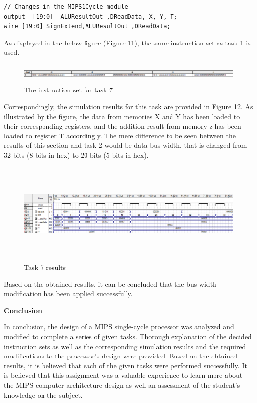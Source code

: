 \documentclass[12pt,a4paper]{article}
\begin{document}
	\begin{lstlisting}[style={verilog-style}]
// Changes in the MIPS1Cycle module
output	[19:0]	ALUResultOut ,DReadData, X, Y, T; 
wire [19:0] SignExtend,ALUResultOut ,DReadData;
\end{lstlisting}

	\vspace{0.4cm}
\noindent As displayed in the below figure (Figure 11), the same instruction set as task 1 is used. 

\begin{figure}[H]
	\centering
	\includegraphics[height=1cm,width=14cm]{figures/code6.png}
	\caption{The instruction set for task 7}
\end{figure}

	\noindent Correspondingly, the simulation results for this task are provided in Figure 12. As illustrated by the figure, the data from memories X and Y has been loaded to their corresponding registers, and the addition result from memory z has been loaded to register T accordingly. The mere difference to be seen between the results of this section and task 2 would be data bus width, that is changed from 32 bits (8 bits in hex) to 20 bits (5 bits in hex).
		
	\begin{figure}[H]
		\centering
		\includegraphics[height=5cm,width=15cm]{figures/simulations6.png}
		\caption{Task 7 results}
	\end{figure}

\vspace{-0.4cm}
	\noindent Based on the obtained results, it can be concluded that the bus width modification has been applied successfully. 

\vspace{0.4cm}
	\noindent \textbf{\Large Conclusion}
	\vspace{0.2cm}
	
	\noindent In conclusion, the design of a MIPS single-cycle processor was analyzed and modified to complete a series of given tasks. Thorough explanation of the decided instruction sets as well as the corresponding simulation results and the required modifications to the processor's design were provided. Based on the obtained results, it is believed that each of the given tasks were performed successfully. It is believed that this assignment was a valuable experience to learn more about the MIPS computer architecture design as well an assessment of the student's knowledge on the subject. 
	
\end{document}
